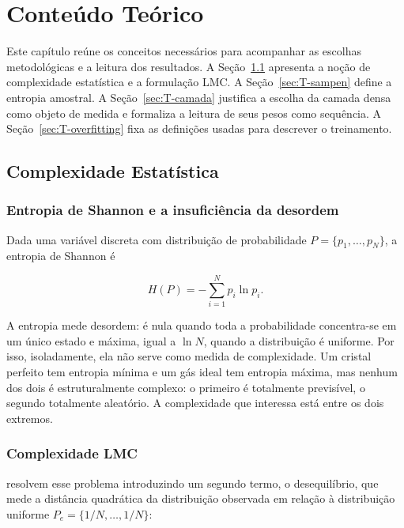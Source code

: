 \chapter{Conteúdo Teórico}
\label{cap:teorico}

Este capítulo reúne os conceitos necessários para acompanhar as escolhas
metodológicas e a leitura dos resultados. A Seção~\ref{sec:T-complexidade}
apresenta a noção de complexidade estatística e a formulação LMC. A
Seção~\ref{sec:T-sampen} define a entropia amostral. A Seção~\ref{sec:T-camada} justifica a escolha da camada densa
como objeto de medida e formaliza a leitura de seus pesos como sequência. A
Seção~\ref{sec:T-overfitting} fixa as definições usadas para descrever o
treinamento.

\section{Complexidade Estatística}
\label{sec:T-complexidade}

\subsection{Entropia de Shannon e a insuficiência da desordem}

Dada uma variável discreta com distribuição de probabilidade
$P = \{p_1, \dots, p_N\}$, a entropia de Shannon \cite{shannon1948} é

\begin{equation}
    H(P) = -\sum_{i=1}^{N} p_i \ln p_i .
    \label{eq:shannon}
\end{equation}

A entropia mede desordem: é nula quando toda a probabilidade concentra-se em um
único estado e máxima, igual a $\ln N$, quando a distribuição é uniforme. Por
isso, isoladamente, ela não serve como medida de complexidade. Um cristal
perfeito tem entropia mínima e um gás ideal tem entropia máxima, mas nenhum dos
dois é estruturalmente complexo: o primeiro é totalmente previsível, o segundo
totalmente aleatório. A complexidade que interessa está entre os dois extremos.

\subsection{Complexidade LMC}

 resolvem esse problema introduzindo um segundo termo, o
desequilíbrio, que mede a distância quadrática da distribuição observada em
relação à distribuição uniforme $P_e = \{1/N, \dots, 1/N\}$:

